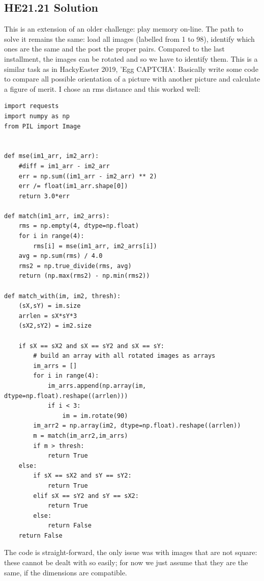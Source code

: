 \documentclass[english,a4paper,nols,noindent]{tufte-handout}
\begin{document}
\hypertarget{he21.21-solution}{%
\subsection{HE21.21 Solution}\label{he21.21-solution}}

\noindent This is an extension of an older challenge: play memory on-line.  The
path to solve it remains the same: load all images (labelled from 1 to 98),
identify which ones are the same and the post the proper pairs.  Compared to
the last installment, the images can be rotated and so we have to identify
them.  This is a similar task as in HackyEaster 2019, 'Egg CAPTCHA'.  Basically
write some code to compare all possible orientation of a picture with another
picture and calculate a figure of merit.  I chose an rms distance and this
worked well:

\begin{verbatim}
import requests
import numpy as np
from PIL import Image


def mse(im1_arr, im2_arr):
    #diff = im1_arr - im2_arr
    err = np.sum((im1_arr - im2_arr) ** 2)
    err /= float(im1_arr.shape[0])
    return 3.0*err

def match(im1_arr, im2_arrs):
    rms = np.empty(4, dtype=np.float)
    for i in range(4):
        rms[i] = mse(im1_arr, im2_arrs[i])
    avg = np.sum(rms) / 4.0
    rms2 = np.true_divide(rms, avg)
    return (np.max(rms2) - np.min(rms2))

def match_with(im, im2, thresh):
    (sX,sY) = im.size
    arrlen = sX*sY*3
    (sX2,sY2) = im2.size

    if sX == sX2 and sX == sY2 and sX == sY:
        # build an array with all rotated images as arrays
        im_arrs = []
        for i in range(4):
            im_arrs.append(np.array(im, dtype=np.float).reshape((arrlen)))
            if i < 3:
                im = im.rotate(90)
        im_arr2 = np.array(im2, dtype=np.float).reshape((arrlen))
        m = match(im_arr2,im_arrs)
        if m > thresh:
            return True
    else:
        if sX == sX2 and sY == sY2:
            return True
        elif sX == sY2 and sY == sX2:
            return True
        else:
            return False
    return False
\end{verbatim}

The code is straight-forward, the only issue was with images that are not
square: these cannot be dealt with so easily; for now we just assume that they
are the same, if the dimensions are compatible.
\end{document}

